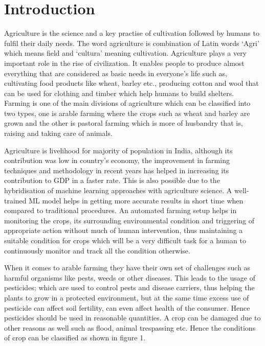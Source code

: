 \documentclass[12pt]{article}
\begin{document}
	
	
	\newpage
	
	\newpage
	\tableofcontents
	\newpage
	\listoftables
	\newpage
	\listoffigures
	\newpage
	\section{Introduction}
	
Agriculture is the science and a key practise of cultivation followed by humans to fulfil their daily needs. The word agriculture is combination of Latin words ‘Agri’ which means field and ‘cultura’ meaning cultivation. Agriculture plays a very important role in the rise of civilization. It enables people to produce almost everything that are considered as basic needs in everyone’s life such as, cultivating food products like wheat, barley etc., producing cotton and wool that can be used for clothing and timber which help humans to build shelters. Farming is one of the main divisions of agriculture which can be classified into two types, one is arable farming where the crops such as wheat and barley are grown and the other is pastoral farming which is more of husbandry that is, raising and taking care of animals.

Agriculture is livelihood for majority of population in India, although its contribution was low in country's economy, the improvement in farming techniques and methodology in recent years has helped in increasing its contribution to GDP in a faster rate. This is also possible due to the hybridisation of machine learning approaches with agriculture science. A well-trained ML model helps in getting more accurate results in short time when compared to traditional procedures. An automated farming setup helps in monitoring the crops, its surrounding environmental condition and triggering of appropriate action without much of human intervention, thus maintaining a suitable condition for crops which will be a very difficult task for a human to continuously monitor and track all the condition otherwise.

When it comes to arable farming they have their own set of challenges such as harmful organisms like pests, weeds or other diseases. This leads to the usage of pesticides; which are used to control pests and disease carriers, thus helping the plants to grow in a protected environment, but at the same time excess use of pesticide can affect soil fertility, can even affect health of the consumer. Hence pesticides should be used in reasonable quantities. A crop can be damaged due to other reasons as well such as flood, animal trespassing etc. Hence the conditions of crop can be classified as shown in figure 1.
\end{document}
